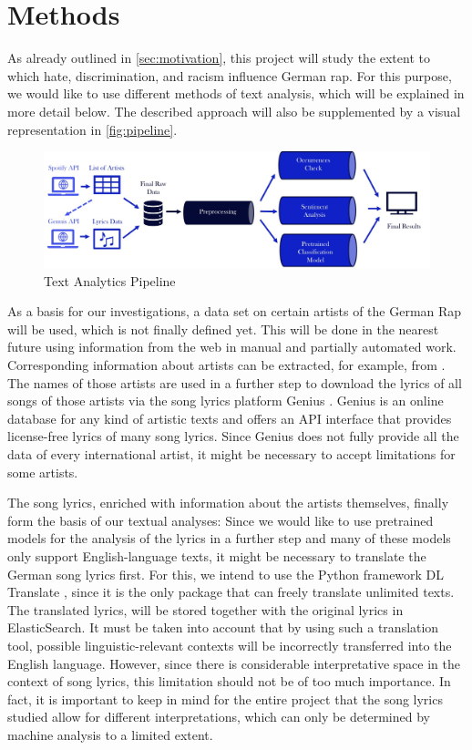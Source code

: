 \section{Methods}\label{sec:project}

As already outlined in \autoref{sec:motivation}, this project will study the extent to which hate, discrimination, and racism influence German rap. For this purpose, we would like to use different methods of text analysis, which will be explained in more detail below. The described approach will also be supplemented by a visual representation in \autoref{fig:pipeline}.

\begin{figure}[!htb]
  \centering
  \includegraphics[width=\textwidth]{figures/pipeline.jpg}
  \caption[]{Text Analytics Pipeline}
  \label{fig:pipeline}
  \end{figure}

As a basis for our investigations, a data set on certain artists of the German Rap will be used, which is not finally defined yet. This will be done in the nearest future using information from the web in manual and partially automated work. Corresponding information about artists can be extracted, for example, from \cite{last.fm,tonspion_2021}. The names of those artists are used in a further step to download the lyrics of all songs of those artists via the song lyrics platform Genius \cite{genius}. Genius is an online database for any kind of artistic texts and offers an API interface that provides license-free lyrics of many song lyrics. Since Genius does not fully provide all the data of every international artist, it might be necessary to accept limitations for some artists.

The song lyrics, enriched with information about the artists themselves, finally form the basis of our textual analyses: Since we would like to use pretrained models for the analysis of the lyrics in a further step and many of these models only support English-language texts, it might be necessary to translate the German song lyrics first. For this, we intend to use the Python framework DL Translate \cite{lu_2022}, since it is the only package that can freely translate unlimited texts. The translated lyrics, will be stored together with the original lyrics in ElasticSearch. It must be taken into account that by using such a translation tool, possible linguistic-relevant contexts will be incorrectly transferred into the English language. However, since there is considerable interpretative space in the context of song lyrics, this limitation should not be of too much importance. In fact, it is important to keep in mind for the entire project that the song lyrics studied allow for different interpretations, which can only be determined by machine analysis to a limited extent.

